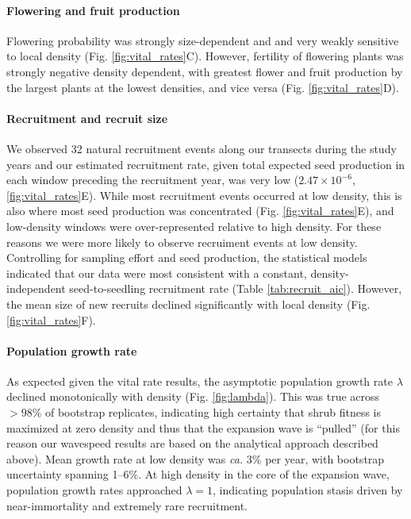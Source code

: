 \documentclass[11pt]{article}\usepackage[]{graphicx}\usepackage[]{color}
\begin{document}
\paragraph{Flowering and fruit production}
Flowering probability was strongly size-dependent and and very weakly sensitive to local density (Fig. \ref{fig:vital_rates}C). 
However, fertility of flowering plants was strongly negative density dependent, with greatest flower and fruit production by the largest plants at the lowest densities, and vice versa (Fig. \ref{fig:vital_rates}D).

\paragraph{Recruitment and recruit size}
We observed 32 natural recruitment events along our transects during the study years and our estimated recruitment rate, given total expected seed production in each window preceding the recruitment year, was very low ($2.47 \times 10^{-6}$, \ref{fig:vital_rates}E). 
While most recruitment events occurred at low density, this is also where most seed production was concentrated (Fig. \ref{fig:vital_rates}E), and low-density windows were over-represented relative to high density. 
For these reasons we were more likely to observe recruiment events at low density. 
Controlling for sampling effort and seed production, the statistical models indicated that our data were most consistent with a constant, density-independent seed-to-seedling recruitment rate (Table \ref{tab:recruit_aic}). 
However, the mean size of new recruits declined significantly with local density (Fig. \ref{fig:vital_rates}F).


\paragraph{Population growth rate}
As expected given the vital rate results, the asymptotic population growth rate $\lambda$ declined monotonically with density (Fig. \ref{fig:lambda}). 
This was true across $>98\%$ of bootstrap replicates, indicating high certainty that shrub fitness is maximized at zero density and thus that the expansion wave is ``pulled'' (for this reason our wavespeed results are based on the analytical approach described above). 
Mean growth rate at low density was \textit{ca.} 3\% per year, with bootstrap uncertainty spanning 1--6\%.
At high density in the core of the expansion wave, population growth rates approached $\lambda=1$, indicating population stasis driven by near-immortality and extremely rare recruitment. 
\end{document}

